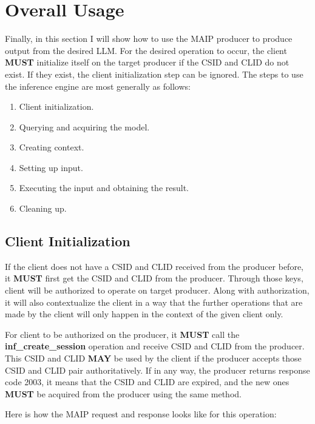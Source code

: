 \documentclass{article}
\begin{document}
\section{Overall Usage}
Finally, in this section I will show how to use the MAIP producer to produce output from the desired LLM. For the desired operation to occur, the client \textbf{MUST} initialize itself on the target producer if the CSID and CLID do not exist. If they exist, the client initialization step can be ignored. The steps to use the inference engine are most generally as follows:\newline

\begin{enumerate}
  \item Client initialization.
  \item Querying and acquiring the model.
  \item Creating context.
  \item Setting up input.
  \item Executing the input and obtaining the result.
  \item Cleaning up.
\end{enumerate}

\subsection{Client Initialization}
If the client does not have a CSID and CLID received from the producer before, it \textbf{MUST} first get the CSID and CLID from the producer. Through those keys, client will be authorized to operate on target producer. Along with authorization, it will also contextualize the client in a way that the further operations that are made by the client will only happen in the context of the given client only.\newline

For client to be authorized on the producer, it \textbf{MUST} call the \textbf{inf\_create\_session} operation and receive CSID and CLID from the producer. This CSID and CLID \textbf{MAY} be used by the client if the producer accepts those CSID and CLID pair authoritatively. If in any way, the producer returns response code 2003, it means that the CSID and CLID are expired, and the new ones \textbf{MUST} be acquired from the producer using the same method.\newline

Here is how the MAIP request and response looks like for this operation:\newline
\end{document}
